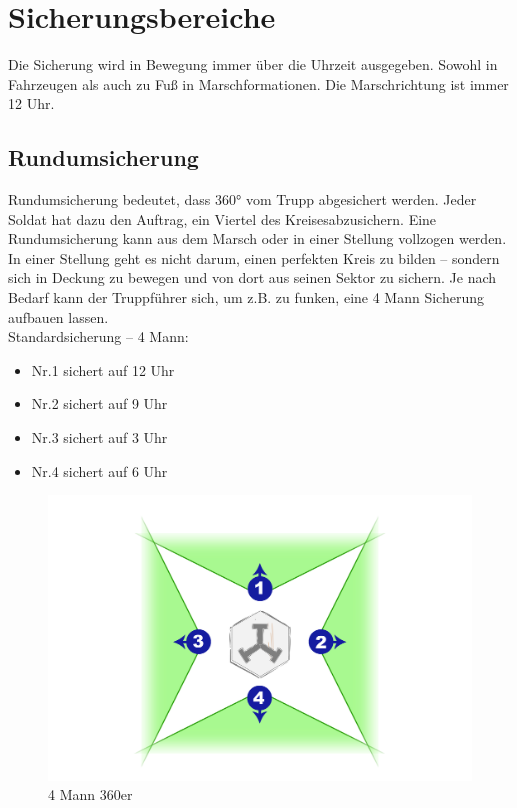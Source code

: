 \newpage

\section{Sicherungsbereiche}
	Die Sicherung wird in Bewegung immer über die Uhrzeit ausgegeben. Sowohl in Fahrzeugen als auch zu Fuß in Marschformationen.  Die Marschrichtung ist immer 12 Uhr. \\

\subsection{Rundumsicherung}
	 Rundumsicherung bedeutet, dass 360° vom Trupp abgesichert werden. Jeder Soldat hat dazu den Auftrag, ein Viertel des \glqq Kreises\grqq\space abzusichern. Eine Rundumsicherung kann aus dem Marsch oder in einer Stellung vollzogen werden. In einer Stellung geht es nicht darum, einen perfekten Kreis zu bilden – sondern sich in Deckung zu bewegen und von dort aus seinen Sektor zu sichern. Je nach Bedarf kann der Truppführer sich, um z.B. zu funken, eine 4 Mann Sicherung aufbauen lassen. \\
	Standardsicherung  – 4 Mann: 
		\begin{itemize}
			\item Nr.1 sichert auf 12 Uhr 
			\item Nr.2 sichert auf 9 Uhr 
			\item Nr.3 sichert auf 3 Uhr 
			\item Nr.4 sichert auf 6 Uhr 
		\end{itemize}
		\begin{figure}[htbp]
			\centering
			\includegraphics[width=0.8\linewidth]{./img/grundlagen/sicherungen/360grad_sicherung_4mann.jpg}
			\caption{4 Mann 360er}
		\end{figure}

